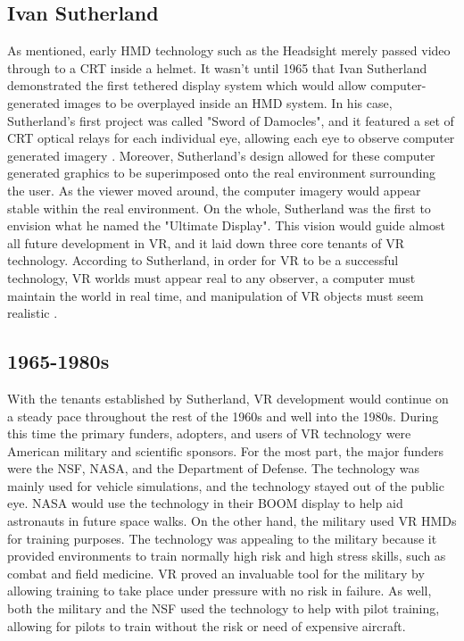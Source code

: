 \subsection{Ivan Sutherland}
\label{sec:history2}

As mentioned, early HMD technology such as the Headsight merely passed video through to a CRT inside a helmet. It wasn't until 1965 that Ivan Sutherland demonstrated the first tethered display system which would allow computer-generated images to be overplayed inside an HMD system. In his case, Sutherland's first project was called "Sword of Damocles", and it featured a set of CRT optical relays for each individual eye, allowing each eye to observe computer generated imagery \cite{steve_2008}. Moreover, Sutherland's design allowed for these computer generated graphics to be superimposed onto the real environment surrounding the user. As the viewer moved around, the computer imagery would appear stable within the real environment. On the whole, Sutherland was the first to envision what he named the "Ultimate Display". This vision would guide almost all future development in VR, and it laid down three core tenants of VR technology. According to Sutherland, in order for VR to be a successful technology, VR worlds must appear real to any observer, a computer must maintain the world in real time,  and manipulation of VR objects must seem realistic \cite{packer_multimedia:_2001}.

\subsection{1965-1980s}
\label{sec:history3}

With the tenants established by Sutherland, VR development would continue on a steady pace throughout the rest of the 1960s and well into the 1980s. During this time the primary funders, adopters, and users of VR technology were American military and scientific sponsors. For the most part, the major funders were the NSF, NASA, and the Department of Defense. The technology was mainly used for vehicle simulations, and the technology stayed out of the public eye. NASA would use the technology in their BOOM display to help aid astronauts in future space walks. On the other hand, the military used VR HMDs for training purposes. The technology was appealing to the military because it provided environments to train normally high risk and high stress skills, such as combat and field medicine. VR proved an invaluable tool for the military by allowing training to take place under pressure with no risk in failure. As well, both the military and the NSF used the technology to help with pilot training, allowing for pilots to train without the risk or need of expensive aircraft.

